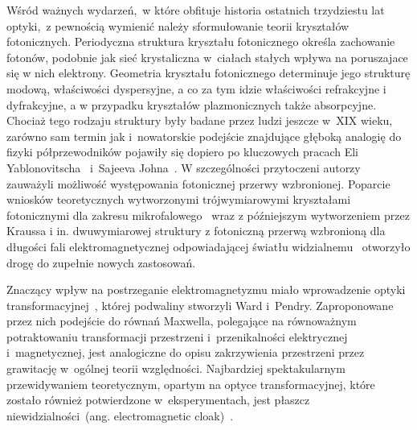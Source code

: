 
Wśród ważnych wydarzeń,~w które obfituje historia ostatnich trzydziestu lat optyki,~z pewnością wymienić należy sformułowanie teorii kryształów fotonicznych. Periodyczna struktura kryształu fotonicznego określa zachowanie fotonów, podobnie jak sieć krystaliczna w~ciałach stałych wpływa na poruszajace się w nich elektrony. Geometria kryształu fotonicznego determinuje jego strukturę modową, właściwości dyspersyjne, a co za tym idzie właściwości refrakcyjne i dyfrakcyjne, a w przypadku kryształów plazmonicznych także absorpcyjne. Chociaż tego rodzaju struktury były badane przez ludzi jeszcze w~XIX wieku, zarówno sam termin jak i~nowatorskie podejście znajdujące głęboką analogię do fizyki półprzewodników pojawiły się dopiero po kluczowych pracach Eli Yablonovitscha~\cite{yablonovitch1987inhibited} i~Sajeeva Johna~\cite{john1987strong}. W szczególności przytoczeni autorzy zauważyli możliwość występowania fotonicznej przerwy wzbronionej. Poparcie wniosków teoretycznych wytworzonymi trójwymiarowymi kryształami fotonicznymi dla zakresu mikrofalowego~\cite{yablonovitch1991photonic} wraz z późniejszym wytworzeniem przez Kraussa i in. dwuwymiarowej struktury z fotoniczną przerwą wzbronioną dla długości fali elektromagnetycznej odpowiadającej światłu widzialnemu~\cite{krauss1996two} otworzyło drogę do zupełnie nowych zastosowań.

Znaczący wpływ na postrzeganie elektromagnetyzmu miało wprowadzenie optyki transformacyjnej~\cite{ward1996refraction,han2008ray,kildishev2008engineering,li2009designing,gao2016translation}, której podwaliny stworzyli Ward i~Pendry. Zaproponowane  przez nich podejście do równań Maxwella, polegające na równoważnym potraktowaniu transformacji przestrzeni i~przenikalności elektrycznej i~magnetycznej, jest analogiczne do opisu zakrzywienia przestrzeni przez grawitację w~ogólnej teorii względności. Najbardziej spektakularnym przewidywaniem teoretycznym, opartym na optyce transformacyjnej, które zostało również potwierdzone w~eksperymentach, jest płaszcz niewidzialności~(ang. electromagnetic cloak)~\cite{schurig2006metamaterial,sun2016optic,alitalo2009electromagnetic}.

